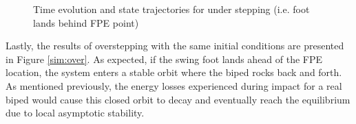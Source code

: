 \begin{figure}[!b]
	\begin{center}
	\end{center}
  	\caption{Time evolution and state trajectories for under stepping (i.e. foot lands behind FPE point)}
	\label{sim:under}
\end{figure}

Lastly, the results of overstepping with the same initial conditions are presented in Figure \ref{sim:over}. As expected, if the swing foot lands ahead of the FPE location, the system enters a stable orbit where the biped rocks back and forth. As mentioned previously, the energy losses experienced during impact for a real biped would cause this closed orbit to decay and eventually reach the equilibrium due to local asymptotic stability. 

